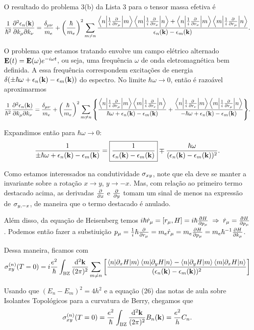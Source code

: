 \documentclass[a4paper,10pt]{article}
\begin{document}
O resultado do problema 3(b) da Lista 3 para o tensor massa efetiva é
$$
\frac{1}{\hbar^2} \pdv{\epsilon_n(\vb{k})}{k_\mu}{k_\nu} =
\frac{\delta_{\mu\nu}}{m_e} +
\qty(\frac{\hbar}{m_e})^2
\sum_{m\neq n}
\frac{
\mel**{n}{\frac{1}{i}\pdv{r_\mu}}{m} \mel**{m}{\frac{1}{i}\pdv{r_\nu}}{n} +
\mel**{n}{\frac{1}{i}\pdv{r_\nu}}{m} \mel**{m}{\frac{1}{i}\pdv{r_\mu}}{n}
}{\epsilon_n(\vb{k}) - \epsilon_{m}(\vb{k})}.
$$

O problema que estamos tratando envolve um campo elétrico alternado $\vb{E}(t) = \vb{E}(\omega) e^{-i\omega t}$, ou seja, uma frequência $\omega$ de onda eletromagnética bem definida. A essa frequência correspondem excitações de energia $\delta(\pm \hbar \omega + \epsilon_n(\vb{k}) - \epsilon_m(\vb{k}))$ do espectro. No limite $\hbar \omega \to 0$, então é razoável aproximarmos
$$
\frac{1}{\hbar^2} \pdv{\epsilon_n(\vb{k})}{k_\mu}{k_\nu} =
\frac{\delta_{\mu\nu}}{m_e} +
\qty(\frac{\hbar}{m_e})^2
\sum_{m\neq n} \qty{
\frac{\mel**{n}{\frac{1}{i}\pdv{r_\mu}}{m} \mel**{m}{\frac{1}{i}\pdv{r_\nu}}{n}}
{\hbar \omega + \epsilon_n(\vb{k}) - \epsilon_{m}(\vb{k})} +
\frac{\mel**{n}{\frac{1}{i}\pdv{r_\nu}}{m} \mel**{m}{\frac{1}{i}\pdv{r_\mu}}{n}}
{-\hbar \omega + \epsilon_n(\vb{k}) - \epsilon_{m}(\vb{k})}
} .
$$

Expandimos então para $\hbar \omega \to 0$:
$$
\frac{1}{\pm \hbar \omega + \epsilon_n(\vb{k}) - \epsilon_m(\vb{k})} =
\boxed{\frac{1}{\epsilon_n(\vb{k}) - \epsilon_m(\vb{k})}}
\mp \frac{\hbar\omega}{(\epsilon_n(\vb{k}) - \epsilon_m(\vb{k}))^2}.
$$

Como estamos interessados na condutividade $\sigma_{xy}$, note que ela deve se manter a invariante sobre a rotação $x \to y$, $y \to -x$. Mas, com relação ao primeiro termo destacado acima, as derivadas $\pdv{x}$ e $\pdv{y}$ tomam um sinal de menos na expressão de $\sigma_{y,-x}$, de maneira que o termo destacado é anulado.

Além disso, da equação de Heisenberg temos $i\hbar \dot{r}_\mu = [r_\mu, H] = i\hbar \pdv{H}{p_\mu} \; \Rightarrow \; \dot{r}_\mu = \pdv{H}{p_\mu}$. Podemos então fazer a substiuição $p_\mu = \frac{1}{i} \hbar \pdv{r_\mu} = m_e \dot{r}_\mu = m_e \pdv{H}{p_\mu} = m_e \hbar^{-1} \pdv{H}{k_\mu}$.

Dessa maneira, ficamos com
$$
\sigma^{(n)}_{xy}(T=0) =i\frac{e^2}{\hbar}\int_{\text{BZ}}\frac{\dd[2]{\vb{k}}}{(2\pi)^2}
\sum_{m\neq n}
\qty[
\frac{
\mel**{n}{\partial_x H}{m} \mel**{m}{\partial_y H}{n} -
\mel**{n}{\partial_y H}{m} \mel**{m}{\partial_x H}{n}
}{(\epsilon_n(\vb{k}) - \epsilon_{m}(\vb{k}))^2} ]
$$

Usando que $(E_n - E_m)^2 = 4h^2$ e a equação (26) das notas de aula sobre Isolantes Topológicos para a curvatura de Berry, chegamos que
$$
\sigma^{(n)}_{xy}(T=0) =
\frac{e^2}{\hbar} \int_{\text{BZ}} \frac{\dd[2]{\vb{k}}}{(2\pi)^2} B_n(\vb{k}) =
\frac{e^2}{h} C_n.
$$
\end{document}
